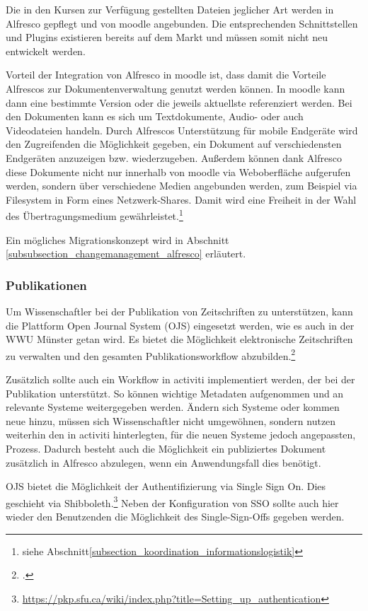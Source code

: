 Die in den Kursen zur Verfügung gestellten Dateien jeglicher Art werden in Alfresco gepflegt und von moodle angebunden. Die entsprechenden Schnittstellen und Plugins existieren bereits auf dem Markt und müssen somit nicht neu entwickelt werden.

Vorteil der Integration von Alfresco in moodle ist, dass damit die Vorteile Alfrescos zur Dokumentenverwaltung genutzt werden können. In moodle kann dann eine bestimmte Version oder die jeweils aktuellste referenziert werden. Bei den Dokumenten kann es sich um Textdokumente, Audio- oder auch Videodateien handeln. Durch Alfrescos Unterstützung für mobile Endgeräte wird den Zugreifenden die Möglichkeit gegeben, ein Dokument auf verschiedensten Endgeräten anzuzeigen bzw. wiederzugeben. Außerdem können dank Alfresco diese Dokumente nicht nur innerhalb von moodle via Weboberfläche aufgerufen werden, sondern über verschiedene Medien angebunden werden, zum Beispiel via Filesystem in Form eines Netzwerk-Shares. 
Damit wird eine Freiheit in der Wahl des Übertragungsmedium gewährleistet.\footnote{siehe Abschnitt\ref{subsection_koordination_informationslogistik}}

Ein mögliches Migrationskonzept wird in Abschnitt \ref{subsubsection_changemanagement_alfresco} erläutert.

\subsubsection{Publikationen}
Um Wissenschaftler bei der Publikation von Zeitschriften zu unterstützen, kann die Plattform Open Journal System (OJS) eingesetzt werden, wie es auch in der WWU Münster getan wird. Es bietet die Möglichkeit elektronische Zeitschriften zu verwalten und den gesamten Publikationsworkflow abzubilden.\footcite[Vgl.][48]{vogl_fortschritte_2012}

Zusätzlich sollte auch ein Workflow in activiti implementiert werden, der bei der Publikation unterstützt. So können wichtige Metadaten aufgenommen und an relevante Systeme weitergegeben werden. Ändern sich Systeme oder kommen neue hinzu, müssen sich Wissenschaftler nicht umgewöhnen, sondern nutzen weiterhin den in activiti hinterlegten, für die neuen Systeme jedoch angepassten, Prozess. Dadurch besteht auch die Möglichkeit ein publiziertes Dokument zusätzlich in Alfresco abzulegen, wenn ein Anwendungsfall dies benötigt.

OJS bietet die Möglichkeit der Authentifizierung via Single Sign On. Dies geschieht via Shibboleth.\footnote{\url{https://pkp.sfu.ca/wiki/index.php?title=Setting_up_authentication}} Neben der Konfiguration von SSO sollte auch hier wieder den Benutzenden die Möglichkeit des Single-Sign-Offs gegeben werden.

